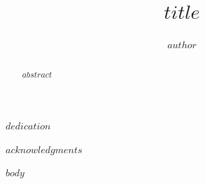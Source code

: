\documentclass[print]{nuthesis}
\begin{document}
\frontmatter
\title{$title$}
\author{$author$}
\maketitle


\begin{abstract}
    $abstract$
\end{abstract}

\begin{copyrightpage}
\end{copyrightpage}

\begin{dedication}
$dedication$
\end{dedication}

\begin{acknowledgments}
$acknowledgments$
\end{acknowledgments}


\tableofcontents

\listoffigures
\listoftables

\mainmatter


$body$


\backmatter

% 





\end{document}
